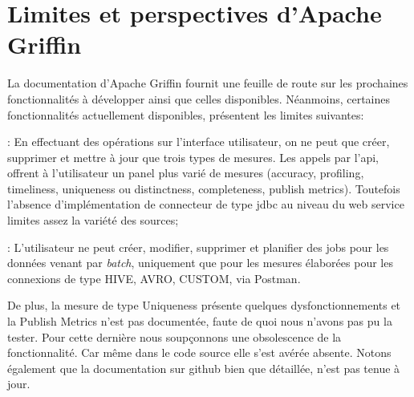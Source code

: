 \section{Limites et perspectives d'Apache Griffin}

La documentation d'Apache Griffin fournit une feuille de route sur les prochaines fonctionnalit\'es \`a d\'evelopper ainsi que celles disponibles. N\'eanmoins, certaines fonctionnalit\'es actuellement disponibles, pr\'esentent les limites suivantes: 
\begin{description}[parsep=0cm,itemsep=0cm]
\item[la gestion des mesures] : En effectuant des op\'erations sur l'interface utilisateur, on ne peut que cr\'eer, supprimer et mettre \`a jour que trois types de mesures. Les appels par l'\acrshort{api}, offrent \`a l'utilisateur un panel plus vari\'e de mesures (accuracy, profiling, timeliness, uniqueness ou distinctness, completeness, publish metrics). Toutefois l'absence d'impl\'ementation de connecteur de type \acrshort{jdbc} au niveau du web service limites assez la vari\'et\'e des sources;

\item[la gestion de l'ex\'ecution des mesures (jobs)]: L'utilisateur ne peut créer, modifier, supprimer et  planifier des jobs pour les donn\'ees venant par \textit{batch}, uniquement que pour les mesures \'elabor\'ees pour les connexions de type HIVE, AVRO, CUSTOM, via Postman. 
\end{description}
De plus, la mesure de type Uniqueness pr\'esente quelques dysfonctionnements et la Publish Metrics n'est pas document\'ee, faute de quoi nous n'avons pas pu la tester. Pour cette derni\`ere nous soupçonnons une obsolescence de la fonctionnalit\'e. Car m\^eme dans le code source elle s'est av\'er\'ee absente. Notons \'egalement que la documentation sur github bien que d\'etaill\'ee, n'est pas tenue \`a jour. 
\\

